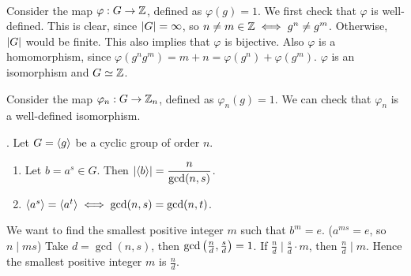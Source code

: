 \pf \\
 Consider the map \(\varphi: G \rightarrow \mathbb{Z}\), defined as \(\varphi(g) = 1\). We first check that \(\varphi\) is well-defined. This is clear, since \(\left| G \right| = \infty\), so \(n \neq m \in \mathbb{Z} \iff g^n \neq g^m\). Otherwise, \(\left| G \right|\) would be finite. This also implies that \(\varphi\) is bijective. Also \(\varphi\) is a homomorphism, since \(\varphi(g^n g^m) = m + n = \varphi(g^n) + \varphi(g^m)\). \(\varphi\) is an isomorphism and \(G \simeq \mathbb{Z}\).

 Consider the map \(\varphi_n: G \rightarrow \mathbb{Z}_n\), defined as \(\varphi_n(g) = 1\). We can check that \(\varphi_n\) is a well-defined isomorphism.

\thm. Let \(G = \left\langle g \right\rangle\) be a cyclic group of order \(n\).
\begin{enumerate}
    \item Let \(b = a^s \in G\). Then \(\left| \left\langle b \right\rangle \right| = \dfrac{n}{\gcd(n, s)}\).
    \item \(\left\langle a^s \right\rangle = \left\langle a^t \right\rangle \iff \gcd(n, s) = \gcd(n, t)\).
\end{enumerate}

\pf
{} We want to find the smallest positive integer \(m\) such that \(b^m = e\). (\(a^{ms} = e\), so \(n \mid ms\)) Take \(d = \gcd(n, s)\), then \(\gcd\left( \frac{n}{d}, \frac{s}{d} \right) = 1\). If \(\frac{n}{d} \mid \frac{s}{d}\cdot m\), then \(\frac{n}{d} \mid m\). Hence the smallest positive integer \(m\) is \(\frac{n}{d}\).

\pagebreak
